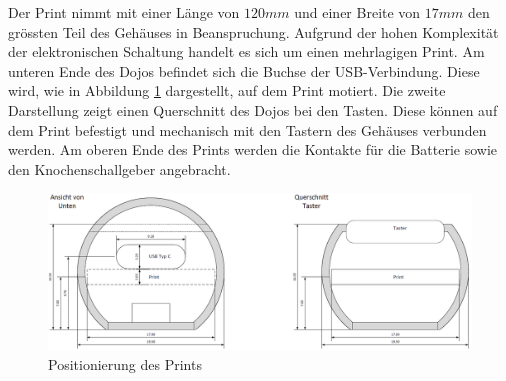 Der Print nimmt mit einer Länge von $120mm$ und einer Breite von $17mm$ den grössten Teil des Gehäuses in Beanspruchung. Aufgrund der hohen Komplexität der elektronischen Schaltung handelt es sich um einen mehrlagigen Print. Am unteren Ende des Dojos befindet sich die Buchse der USB-Verbindung. Diese wird, wie in Abbildung \ref{fig:DojoPrintQuerschnitt} dargestellt, auf dem Print motiert. Die zweite Darstellung zeigt einen Querschnitt des Dojos bei den Tasten. Diese können auf dem Print befestigt und mechanisch mit den Tastern des Gehäuses verbunden werden. Am oberen Ende des Prints werden die Kontakte für die Batterie sowie den Knochenschallgeber angebracht.

\begin{figure}[h]
	\centering
	\includegraphics[width=\textwidth]{graphics/DojoPrintQuerschnitt.png}
	\caption{Positionierung des Prints}
	\label{fig:DojoPrintQuerschnitt}
\end{figure}


